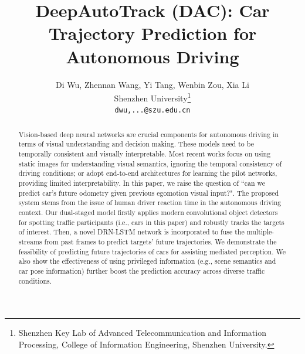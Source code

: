 \documentclass[10pt,twocolumn,letterpaper]{article}
\begin{document}
\title{DeepAutoTrack (DAC): Car Trajectory Prediction for Autonomous Driving}

\author{Di Wu, Zhennan Wang, Yi Tang,  Wenbin Zou, Xia Li\\
Shenzhen University\thanks{Shenzhen Key Lab of Advanced Telecommunication and Information Processing, College of Information Engineering, Shenzhen University.}\\
{\tt\small dwu,...@szu.edu.cn}}
\maketitle
\begin{abstract}

Vision-based deep neural networks are crucial components for autonomous driving in terms of visual understanding and decision making.
These models need to be temporally consistent and visually interpretable.
Most recent works focus on using static images for understanding visual semantics, ignoring the temporal consistency of driving conditions; or adopt end-to-end architectures for learning the pilot networks, providing limited interpretability.
In this paper, we raise the question of ``can we predict car's future odometry given previous egomotion visual input?".
The proposed system stems from the issue of human driver reaction time in the autonomous driving context.
Our dual-staged model firstly applies modern convolutional object detectors for spotting traffic participants (i.e., cars in this paper) and robustly tracks the targets of interest.
Then, a novel DRN-LSTM network is incorporated to fuse the multiple-streams from past frames to predict targets' future trajectories.
We demonstrate the feasibility of predicting future trajectories of cars for assisting mediated perception.
 We also show the effectiveness of using privileged information (e.g., scene semantics and car pose information) further boost the prediction accuracy across diverse traffic conditions.

\end{abstract}
\end{document}
